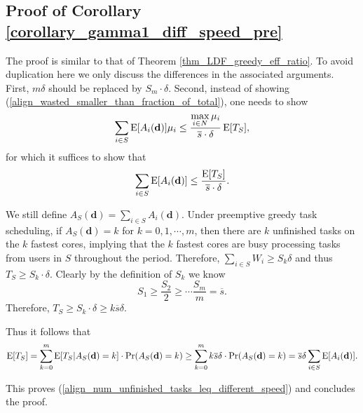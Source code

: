 \documentclass[prodmode,acmtompecs]{acmsmall}
\newcommand{\fullUserSet}{N}
\newcommand{\myComments}[1]{}
\newif\iftompecsextended
\newcommand{\tompecsextendedStart}{\iftompecsextended  \myComments{TOMPECS extended version: }}
\newcommand{\commentEnd}{\myComments{End}}
\begin{document}
\subsection{Proof of Corollary \ref{corollary_gamma1_diff_speed_pre}}
\label{appendix_pf_gamma1_diff_speed_pre}
The proof is similar to that of Theorem \ref{thm_LDF_greedy_eff_ratio}. 
To avoid duplication here we only discuss the differences in the associated arguments. 
First, $m\delta$ should be replaced by $S_m \cdot \delta$. 
Second, instead of showing (\ref{align_wasted_smaller_than_fraction_of_total}), one needs to show
\begin{align}
\label{align_wasted_smaller_than_fraction_of_total_different_speed}
\sum\limits_{i\in S}\expectation[A_i(\mathbf{d})] \mu_i \leq \frac{\max\limits_{i \in \fullUserSet} \mu_i}{\overline{s} \cdot \delta} \expectation[T_S], 
\end{align}
for which it suffices to show that
\begin{align}
\label{align_num_unfinished_tasks_leq_different_speed}
\sum\limits_{i\in S} \operatorname*{\mathrm{E}}[A_i(\mathbf{d})] \leq \frac{\operatorname*{\mathrm{E}}[T_S]}{\overline{s} \cdot \delta}. 
\end{align}

We still define $A_S(\mathbf{d}) = \sum\limits_{i\in S} A_i(\mathbf{d})$. Under preemptive greedy task scheduling, if $A_S(\mathbf{d}) = k$ for $k = 0, 1, \cdots, m$, then there are $k$ unfinished tasks on the $k$ fastest cores, implying that the $k$ fastest cores are busy processing tasks from users in $S$ throughout the period. 
Therefore, $\sum\limits_{i\in S} W_i \geq S_k \delta$ and thus $T_S \geq S_k \cdot \delta$. Clearly by the definition of $S_k$ we know 
$$
S_1 \geq \frac{S_2}{2} \geq \cdots \frac{S_m}{m} = \overline{s}. 
$$
Therefore, $T_S \geq S_k \cdot \delta \geq k \overline{s} \delta$. 

Thus it follows that
\begin{align*}
\operatorname*{\mathrm{E}}[T_S] = \sum\limits_{k = 0}^{m} \operatorname*{\mathrm{E}}[T_S | A_S(\mathbf{d}) = k] \cdot \Pr(A_S(\mathbf{d}) = k) \geq \sum\limits_{k = 0}^{m} k\overline{s}\delta \cdot \Pr(A_S(\mathbf{d}) = k) = \overline{s}\delta \sum\limits_{i\in S} \operatorname*{\mathrm{E}}[A_i(\mathbf{d})]. 
\end{align*}

This proves (\ref{align_num_unfinished_tasks_leq_different_speed}) and concludes the proof. 
\commentEnd\fi

\tompecsextendedStart
\end{document}
